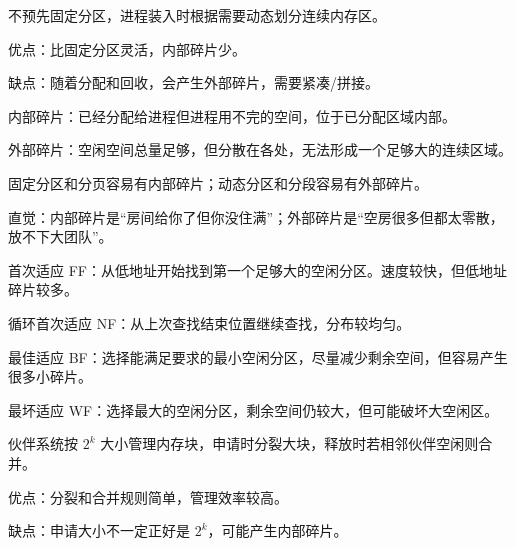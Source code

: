 \begin{points}
  \item 不预先固定分区，进程装入时根据需要动态划分连续内存区。
  \item 优点：比固定分区灵活，内部碎片少。
  \item 缺点：随着分配和回收，会产生外部碎片，需要紧凑/拼接。
\end{points}


\begin{points}
  \item 内部碎片：已经分配给进程但进程用不完的空间，位于已分配区域内部。
  \item 外部碎片：空闲空间总量足够，但分散在各处，无法形成一个足够大的连续区域。
  \item 固定分区和分页容易有内部碎片；动态分区和分段容易有外部碎片。
  \item 直觉：内部碎片是“房间给你了但你没住满”；外部碎片是“空房很多但都太零散，放不下大团队”。
\end{points}


\begin{points}
  \item 首次适应 FF：从低地址开始找到第一个足够大的空闲分区。速度较快，但低地址碎片较多。
  \item 循环首次适应 NF：从上次查找结束位置继续查找，分布较均匀。
  \item 最佳适应 BF：选择能满足要求的最小空闲分区，尽量减少剩余空间，但容易产生很多小碎片。
  \item 最坏适应 WF：选择最大的空闲分区，剩余空间仍较大，但可能破坏大空闲区。
\end{points}


\begin{points}
  \item 伙伴系统按 $2^k$ 大小管理内存块，申请时分裂大块，释放时若相邻伙伴空闲则合并。
  \item 优点：分裂和合并规则简单，管理效率较高。
  \item 缺点：申请大小不一定正好是 $2^k$，可能产生内部碎片。
\end{points}


